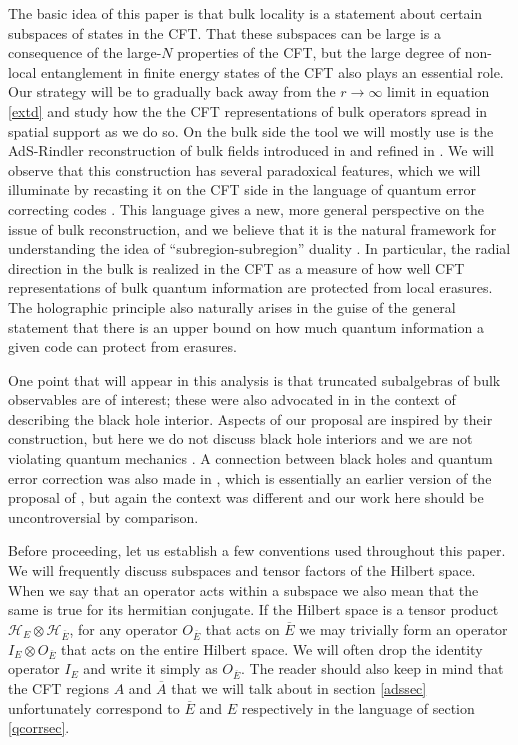 \documentclass[11pt]{article}
\newcommand{\ol}{\overline}
\begin{document}
The basic idea of this paper is that bulk locality is a statement about certain subspaces of states in the CFT.  That these subspaces can be large is a consequence of the large-$N$ properties of the CFT, but the large degree of non-local entanglement in finite energy states of the CFT also plays an essential role.  Our strategy will be to gradually back away from the $r\to \infty$ limit in equation \eqref{extd} and study how the the CFT representations of bulk operators spread in spatial support as we do so.  On the bulk side the tool we will mostly use is the AdS-Rindler reconstruction of bulk fields introduced in \cite{Hamilton:2006az} and refined in \cite{Morrison:2014jha}.  We will observe that this construction has several paradoxical features, which we will illuminate by recasting it on the CFT side in the language of quantum error correcting codes \cite{shor1995scheme,Gottesman:1997zz}.  This language gives a new, more general perspective on the issue of bulk reconstruction, and we believe that it is the natural framework for understanding the idea of ``subregion-subregion'' duality \cite{Bousso:2012sj,Czech:2012bh,Bousso:2012mh,Hubeny:2012wa}.  In particular, the radial direction in the bulk is realized in the CFT as a measure of how well CFT representations of bulk quantum information are protected from local erasures.  The holographic principle also naturally arises in the guise of the general statement that there is an upper bound on how much quantum information a given code can protect from erasures.

One point that will appear in this analysis is that truncated subalgebras of bulk observables are of interest; these were also advocated in \cite{Papadodimas:2013jku} in the context of describing the black hole interior.  Aspects of our proposal are inspired by their construction, but here we do not discuss black hole interiors and we are not violating quantum mechanics \cite{Harlow:2014yoa}.  A connection between black holes and quantum error correction was also made in \cite{Verlinde:2012cy}, which is essentially an earlier version of the proposal of \cite{Papadodimas:2013jku}, but again the context was different and our work here should be uncontroversial by comparison.

Before proceeding, let us establish a few conventions used throughout this paper.  We will frequently discuss subspaces and tensor factors of the Hilbert space.  When we say that an operator acts within a subspace we also mean that the same is true for its hermitian conjugate.  If the Hilbert space is a tensor product $\mathcal{H}_E \otimes \mathcal{H}_{\ol{E}}$, for any operator $O_{\ol{E}}$ that acts on $\ol{E}$ we may trivially form an operator $I_E \otimes O_{\ol{E}}$ that acts on the entire Hilbert space.  We will often drop the identity operator $I_E$ and write it simply as $O_{\ol{E}}$.  The reader should also keep in mind that the CFT regions $A$ and $\ol{A}$ that we will talk about in section \ref{adssec} unfortunately correspond to $\ol{E}$ and $E$ respectively in the language of section \ref{qcorrsec}.
\end{document}
